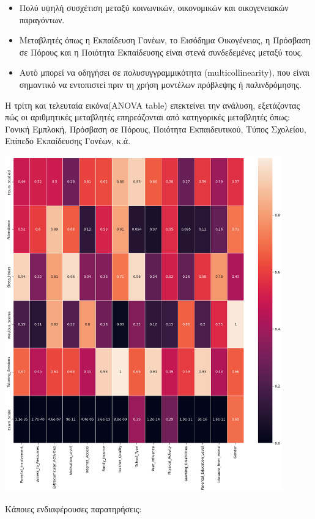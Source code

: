 \documentclass[12pt]{article}
\begin{document}
\begin{itemize}
    \item Πολύ υψηλή συσχέτιση μεταξύ κοινωνικών, οικονομικών και οικογενειακών παραγόντων.
    \item Μεταβλητές όπως η Εκπαίδευση Γονέων, το Εισόδημα Οικογένειας, η Πρόσβαση σε Πόρους και η Ποιότητα Εκπαίδευσης είναι στενά συνδεδεμένες μεταξύ τους.
    \item Αυτό μπορεί να οδηγήσει σε πολυσυγγραμμικότητα (multicollinearity), που είναι σημαντικό να εντοπιστεί πριν τη χρήση μοντέλων πρόβλεψης ή παλινδρόμησης.
\end{itemize}

Η τρίτη και τελευταία εικόνα(ANOVA table) επεκτείνει την ανάλυση, εξετάζοντας πώς οι αριθμητικές μεταβλητές επηρεάζονται από κατηγορικές μεταβλητές όπως: Γονική Εμπλοκή, Πρόσβαση σε Πόρους, Ποιότητα Εκπαιδευτικού, Τύπος Σχολείου, Επίπεδο Εκπαίδευσης Γονέων, κ.ά.

\begin{center}
    \includegraphics[width=0.9\textwidth]{./images/cat_arithmetic_rel.png}
    
\end{center}

\noindent Κάποιες ενδιαφέρουσες παρατηρήσεις:
\end{document}

